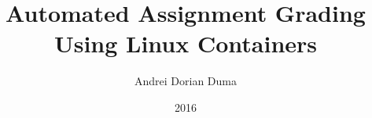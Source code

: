 \title{Automated Assignment Grading Using Linux Containers}
\author{Andrei Dorian Duma}
\date{2016}


\newcommand{\project}{MySuperProject}

